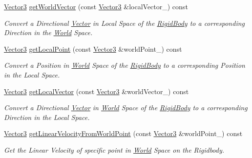 \begin{DoxyCompactItemize}
\hyperlink{class_magnum_1_1_vector3}{Vector3} \hyperlink{class_magnum_1_1_physics3_1_1_rigid_body_a2f3c4dbc90b8f3b52644953c73f16360}{get\+World\+Vector} (const \hyperlink{class_magnum_1_1_vector3}{Vector3} \&local\+Vector\+\_\+) const 
\begin{DoxyCompactList}\small\item\em Convert a Directional \hyperlink{class_magnum_1_1_vector}{Vector} in Local Space of the \hyperlink{class_magnum_1_1_physics3_1_1_rigid_body}{Rigid\+Body} to a corresponding Direction in the \hyperlink{class_magnum_1_1_physics3_1_1_world}{World} Space. \end{DoxyCompactList}\item 
\hyperlink{class_magnum_1_1_vector3}{Vector3} \hyperlink{class_magnum_1_1_physics3_1_1_rigid_body_a5a73730a7f49b264b80b46e53f235fd3}{get\+Local\+Point} (const \hyperlink{class_magnum_1_1_vector3}{Vector3} \&world\+Point\+\_\+) const 
\begin{DoxyCompactList}\small\item\em Convert a Position in \hyperlink{class_magnum_1_1_physics3_1_1_world}{World} Space of the \hyperlink{class_magnum_1_1_physics3_1_1_rigid_body}{Rigid\+Body} to a corresponding Position in the Local Space. \end{DoxyCompactList}\item 
\hyperlink{class_magnum_1_1_vector3}{Vector3} \hyperlink{class_magnum_1_1_physics3_1_1_rigid_body_a3ade32d6c6b96e3353fcb445edec5993}{get\+Local\+Vector} (const \hyperlink{class_magnum_1_1_vector3}{Vector3} \&world\+Vector\+\_\+) const 
\begin{DoxyCompactList}\small\item\em Convert a Directional \hyperlink{class_magnum_1_1_vector}{Vector} in \hyperlink{class_magnum_1_1_physics3_1_1_world}{World} Space of the \hyperlink{class_magnum_1_1_physics3_1_1_rigid_body}{Rigid\+Body} to a corresponding Direction in the Local Space. \end{DoxyCompactList}\item 
\hyperlink{class_magnum_1_1_vector3}{Vector3} \hyperlink{class_magnum_1_1_physics3_1_1_rigid_body_a419aac849d6f92c6d92c2f0c3ffd6723}{get\+Linear\+Velocity\+From\+World\+Point} (const \hyperlink{class_magnum_1_1_vector3}{Vector3} \&world\+Point\+\_\+) const 
\begin{DoxyCompactList}\small\item\em Get the Linear Velocity of specific point in \hyperlink{class_magnum_1_1_physics3_1_1_world}{World} Space on the Rigidbody. \end{DoxyCompactList}\item 

\end{DoxyCompactItemize}
